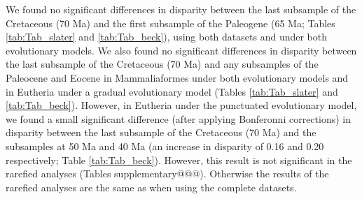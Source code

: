 \documentclass[12pt,letterpaper]{article}
\begin{document}
We found no significant differences in disparity between the last subsample of the Cretaceous (70 Ma) and the first subsample of the Paleogene (65 Ma; Tables \ref{tab:Tab_slater} and \ref{tab:Tab_beck}), using both datasets and under both evolutionary models. 
We also found no significant differences in disparity between the last subsample of the Cretaceous (70 Ma) and any subsamples of the Paleocene and Eocene in Mammaliaformes under both evolutionary models and in Eutheria under a gradual evolutionary model (Tables \ref{tab:Tab_slater} and \ref{tab:Tab_beck}).
However, in Eutheria under the punctuated evolutionary model, we found a small significant difference (after applying Bonferonni corrections) in disparity between the last subsample of the Cretaceous (70 Ma) and the subsamples at 50 Ma and 40 Ma (an increase in disparity of 0.16 and 0.20 respectively; Table \ref{tab:Tab_beck}). %
However, this result is not significant in the rarefied analyses (Tables supplementary@@@). 
Otherwise the results of the rarefied analyses are the same as when using the complete datasets. 

\end{document}

